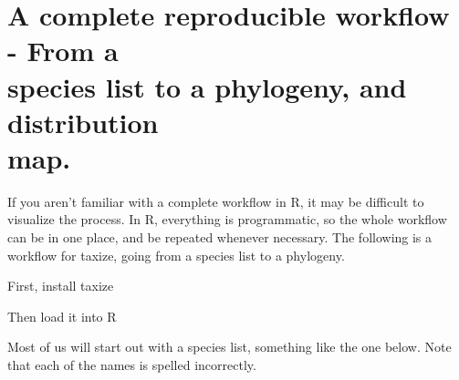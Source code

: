
\section[A complete reproducible workflow]{\texorpdfstring{A complete reproducible workflow - From a\\species list to a phylogeny, and distribution\\map.}{A complete reproducible workflow - From a species list to a phylogeny, and distribution map.}} 
\label{ap:taxize:one} 

If you aren't familiar with a complete workflow in R, it may be difficult to visualize the process. In R, everything is programmatic, so the whole workflow can be in one place, and be repeated whenever necessary. The following is a workflow for taxize, going from a species list to a phylogeny. 

First, install taxize

\begin{knitrout}
\color{fgcolor}\small\begin{kframe}
\begin{alltt}
\hlstd{(}\hlstd{)}
\end{alltt}
\end{kframe}
\end{knitrout}


Then load it into R

\begin{knitrout}
\color{fgcolor}\small\begin{kframe}
\begin{alltt}
\end{alltt}
\end{kframe}
\end{knitrout}


Most of us will start out with a species list, something like the one below. Note that each of the names is spelled incorrectly.

\begin{knitrout}
\color{fgcolor}\small\begin{kframe}
\begin{alltt}
 \hlkwb{<-} \hlstd{(}\hlstd{,} \hlstd{,} 
                \hlstd{,} \hlstd{,}
                \hlstd{,} \hlstd{,} \hlstd{)}
\end{alltt}
\end{kframe}
\end{knitrout}



